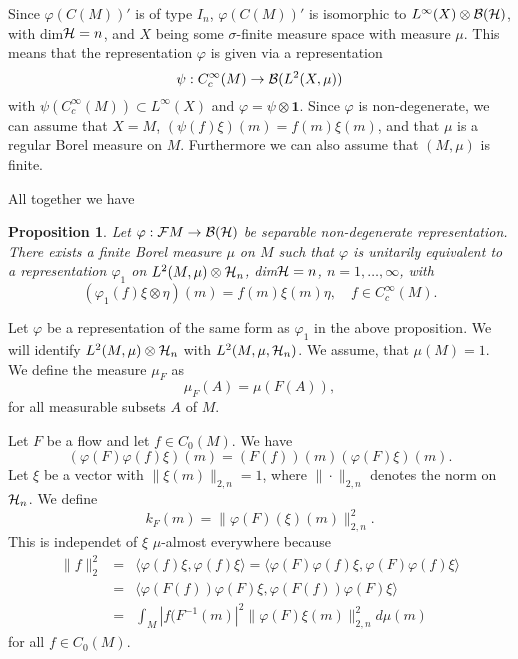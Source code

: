\documentclass[12pt]{article}
\def\cb{{\cal B}}
\def\cf{{\cal F}}
\def\ch{{\cal H}}
\newtheorem{proposition}[thm]{Proposition}
\begin{document}
Since $\varphi (C(M))' $ is of type $I_n$, $\varphi (C(M))' $ is isomorphic to $L^\infty (X)\otimes \cb (\ch ) $, with dim$\ch=n$, and $X$ being some $\sigma$-finite measure space with measure $\mu$. This means that the representation $\varphi$ is given via a representation 
$$\psi: C^\infty_c (M)\to \cb (L^2 (X,\mu )) $$
with $\psi   (C^\infty_c (M) )\subset L^\infty (X)$ and $\varphi =\psi \otimes \mathbf{1}$. Since $\varphi$ is non-degenerate, we can assume that $X=M$,  $(\psi (f)\xi )(m)=f(m)\xi (m)$, and that $\mu$ is a regular Borel measure on $M$. Furthermore we can also assume that $(M,\mu)$ is finite. 

All together we have
\begin{proposition}
Let $\varphi: \cf M \to \cb (\ch )$ be separable non-degenerate representation. There exists a finite Borel measure $\mu$ on $M$ such that $\varphi $ is unitarily equivalent to a representation $\varphi_1$ on $L^2 (M,\mu )\otimes \ch_n$, dim$\ch=n$, $n=1,\ldots ,\infty$, with 
$$(\varphi_1 (f)\xi\otimes \eta)(m)=f(m) \xi (m) \eta, \quad f\in C^\infty_c(M).  $$
\end{proposition}
\vskip 1cm

Let $\varphi$ be a representation of the same form as $\varphi_1$ in the above proposition. We will identify $L^2 (M,\mu )\otimes \ch_n$ with $L^2 (M,\mu , \ch_n)$. We assume, that $\mu (M)=1$. We define the measure $\mu_F$ as
$$\mu_F(A)=\mu (F (A)) , $$
for all  measurable subsets $A$ of $M$.

Let $F$ be a flow and let $f\in C_0(M)$. We have
\begin{equation} \label{id}
(\varphi (F) \varphi (f) \xi )(m) = (F(f)) (m) (\varphi (F) \xi )(m)  .
\end{equation}
Let $\xi$ be a vector with $\| \xi (m)\|_{2,n}=1$, where $\| \cdot \|_{2,n}$ denotes the norm on $\ch_n$. We define
$$k_F(m)=\| \varphi (F) (\xi)(m)  \|^2_{2,n} .$$
This is independet of $\xi$ $\mu$-almost everywhere because
\begin{eqnarray} \label{formel}
\| f\|^2_2 &=& \langle \varphi (f) \xi ,\varphi (f)\xi \rangle =\langle \varphi (F) \varphi (f) \xi , \varphi (F) \varphi (f)\xi \rangle  \nonumber \\
&=& \langle \varphi (F(f)) \varphi (F)  \xi , \varphi (F(f)) \varphi (F)\xi \rangle  \nonumber  \\
&=  & \int_M |f(F^{-1}(m) |^2\| \varphi (F) \xi (m)\|_{2,n}^2  d\mu (m)  
\end{eqnarray}
for all $f\in C_0(M)$. 
\end{document}
